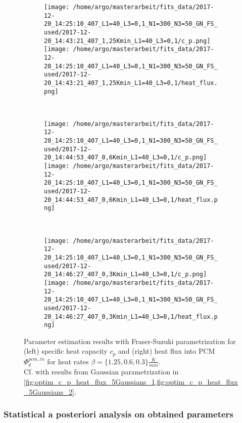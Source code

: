 \documentclass{scrartcl}[12pt, halfparskip]
\numberwithin{equation}{section}
\numberwithin{figure}{section}
\numberwithin{table}{section}
\begin{document}
\begin{figure}[H]
	\begin{subfigure}{1.\textwidth}
		\texttt{[image: /home/argo/masterarbeit/fits\_data/2017-12-20\_14:25:10\_407\_L1=40\_L3=0,1\_N1=300\_N3=50\_GN\_FS\_used/2017-12-20\_14:43:21\_407\_1,25Kmin\_L1=40\_L3=0,1/c\_p.png]}
		\texttt{[image: /home/argo/masterarbeit/fits\_data/2017-12-20\_14:25:10\_407\_L1=40\_L3=0,1\_N1=300\_N3=50\_GN\_FS\_used/2017-12-20\_14:43:21\_407\_1,25Kmin\_L1=40\_L3=0,1/heat\_flux.png]}
	\end{subfigure} \\[1ex]
	
	\begin{subfigure}{1.\textwidth}
		\texttt{[image: /home/argo/masterarbeit/fits\_data/2017-12-20\_14:25:10\_407\_L1=40\_L3=0,1\_N1=300\_N3=50\_GN\_FS\_used/2017-12-20\_14:44:53\_407\_0,6Kmin\_L1=40\_L3=0,1/c\_p.png]}
		\texttt{[image: /home/argo/masterarbeit/fits\_data/2017-12-20\_14:25:10\_407\_L1=40\_L3=0,1\_N1=300\_N3=50\_GN\_FS\_used/2017-12-20\_14:44:53\_407\_0,6Kmin\_L1=40\_L3=0,1/heat\_flux.png]}
	\end{subfigure} \\[1ex]
	
	\begin{subfigure}{1.\textwidth}
		\texttt{[image: /home/argo/masterarbeit/fits\_data/2017-12-20\_14:25:10\_407\_L1=40\_L3=0,1\_N1=300\_N3=50\_GN\_FS\_used/2017-12-20\_14:46:27\_407\_0,3Kmin\_L1=40\_L3=0,1/c\_p.png]}
		\texttt{[image: /home/argo/masterarbeit/fits\_data/2017-12-20\_14:25:10\_407\_L1=40\_L3=0,1\_N1=300\_N3=50\_GN\_FS\_used/2017-12-20\_14:46:27\_407\_0,3Kmin\_L1=40\_L3=0,1/heat\_flux.png]}
	\end{subfigure}
	\caption{Parameter estimation results with Fraser-Suzuki parametrization for (left) specific heat capacity $c_p$ and (right) heat flux into PCM $\varPhi_q^{pcm,in}$ for heat rates $\beta=\{ 1.25, 0.6, 0.3 \} \frac{K}{min}$. \\
	Cf. with results from Gaussian parametrization in \cref{fig:optim_c_p_heat_flux_5Gaussians_1,fig:optim_c_p_heat_flux_5Gaussians_2}.}
	\label{fig:optim_c_p_heat_flux_FS_2}
\end{figure}

\subsubsection{Statistical a posteriori analysis on obtained parameters}
\end{document}

